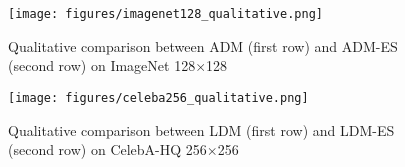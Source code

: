 \documentclass{article} \usepackage{iclr2024_conference,times}
\begin{document}
\begin{figure}[ht]
\vskip 0.0in
\begin{center}
\centerline{\texttt{[image: figures/imagenet128\_qualitative.png]}}
\caption{Qualitative comparison between ADM (first row) and ADM-ES (second row) on ImageNet 128$\times$128 
}
\label{fig: imagenet128_qualitative}
\end{center}
\vskip -0.2in
\end{figure}



\begin{figure}[ht]
\vskip 0.0in
\begin{center}
\centerline{\texttt{[image: figures/celeba256\_qualitative.png]}}
\caption{Qualitative comparison between LDM (first row) and LDM-ES (second row) on CelebA-HQ 256$\times$256 
}
\label{fig: celeba256_qualitative}
\end{center}
\vskip -0.2in
\end{figure}
\end{document}
